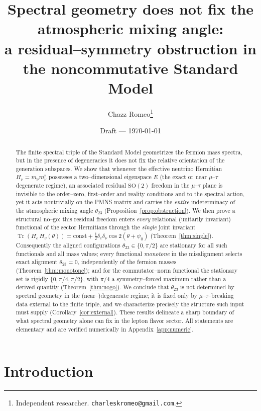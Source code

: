 \documentclass[11pt,a4paper]{article}
\title{\bf Spectral geometry does not fix the atmospheric mixing angle:\\
a residual--symmetry obstruction in the noncommutative Standard Model}
\author{Chazz Romeo\thanks{Independent researcher. \texttt{charleskromeo@gmail.com}.}}
\date{Draft --- \today}
\theoremstyle{definition}
\newcommand{\He}{H_e}
\newcommand{\Hnu}{H_\nu}
\newcommand{\Tr}{\operatorname{Tr}}
\begin{document}
\maketitle

\begin{abstract}
The finite spectral triple of the Standard Model geometrizes the fermion mass
spectra, but in the presence of degeneracies it does not fix the relative
orientation of the generation subspaces. We show that whenever the effective
neutrino Hermitian $\Hnu=m_\nu m_\nu^\dagger$ possesses a two--dimensional
eigenspace $E$ (the exact or near $\mu$--$\tau$ degenerate regime), an associated
residual $\mathrm{SO}(2)$ freedom in the $\mu$--$\tau$ plane is invisible to the
order--zero, first--order and reality conditions and to the spectral action, yet
it acts nontrivially on the PMNS matrix and carries the \emph{entire}
indeterminacy of the atmospheric mixing angle $\theta_{23}$
(Proposition~\ref{prop:obstruction}). We then prove a structural no--go: this
residual freedom enters \emph{every} relational (unitarily invariant) functional
of the sector Hermitians through the \emph{single} joint invariant
$\Tr(\He\,\Hnu(\theta))=\mathrm{const}+\tfrac12\delta_e\delta_\nu\cos 2(\theta+\psi_0)$
(Theorem~\ref{thm:single}). Consequently the aligned configurations
$\theta_{23}\in\{0,\pi/2\}$ are stationary for all such functionals and all mass
values; every functional \emph{monotone} in the misalignment selects exact
alignment $\theta_{23}=0$, independently of the fermion masses
(Theorem~\ref{thm:monotone}); and for the commutator--norm functional the
stationary set is rigidly $\{0,\pi/4,\pi/2\}$, with $\pi/4$ a symmetry--forced
maximum rather than a derived quantity (Theorem~\ref{thm:nogo}). We conclude that
$\theta_{23}$ is not determined by spectral geometry in the (near--)degenerate
regime; it is fixed only by $\mu$--$\tau$--breaking data external to the finite
triple, and we characterize precisely the structure such input must supply
(Corollary~\ref{cor:external}). These results delineate a sharp boundary of what
spectral geometry alone can fix in the lepton flavor sector. All statements are
elementary and are verified numerically in Appendix~\ref{app:numeric}.
\end{abstract}

\section{Introduction}
\end{document}
